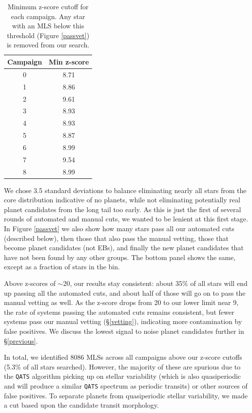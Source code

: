 \documentclass[twocolumn]{aastex62}
\newcommand{\pipeline}[1]{\texttt{#1}}
\newcommand{\npassz}{8086}
\newcommand{\fracpassz}{5.3}
\begin{document}
\begin{table}[tbp]
\caption{Minimum z-score cutoff for each campaign. Any star with
  an MLS below this threshold (Figure \ref{passvet}) is
  removed from our search.
\label{zscorecuts}}
\centering
\begin{tabular}{c c}
\hline
Campaign & Min z-score \\
\hline
0 & 8.71  \\
1 & 8.86  \\
2 & 9.61  \\
3 & 8.93  \\
4 & 8.93  \\
5 & 8.87  \\
6 & 8.99  \\
7 & 9.54  \\
8 & 8.99  \\
\hline
\end{tabular}
\end{table}


We chose 3.5 standard deviations to balance eliminating nearly all
stars from the core distribution indicative of no planets, while not
eliminating potentially real planet candidates from the long tail too
early. As this is just the first of several rounds of automated and
manual cuts, we wanted to be lenient at this first stage. In Figure
\ref{passvet} we also show how many stars pass all our automated cuts
(described below), then those that also pass the manual vetting, those
that become planet candidates (not EBs), and finally the new planet
candidates that have not been found by any other groups. The bottom
panel shows the same, except as a fraction of stars in the bin.

Above z-scores of $\sim20$, our results stay consistent: about 35\% of
all stars will end up passing all the automated cuts, and about half
of those will go on to pass the manual vetting as well. As the z-score
drops from 20 to our lower limit near 9, the rate of systems passing
the automated cuts remains consistent, but fewer systems pass our
manual vetting (\S\ref{vetting}), indicating more contamination by
false positives. We discuss the lowest signal to noise planet
candidates further in \S\ref{previous}.

In total, we identified \npassz{} MLSs across all campaigns above our
z-score cutoffs (\fracpassz{}\% of all stars searched). However, the
majority of these are spurious due to the \pipeline{QATS} algorithm
picking up on stellar variability (which is also quasiperiodic and
will produce a similar \pipeline{QATS} spectrum as periodic transits)
or other sources of false positives. To separate planets from
quasiperiodic stellar variability, we made a cut based upon the
candidate transit morphology.
\end{document}
